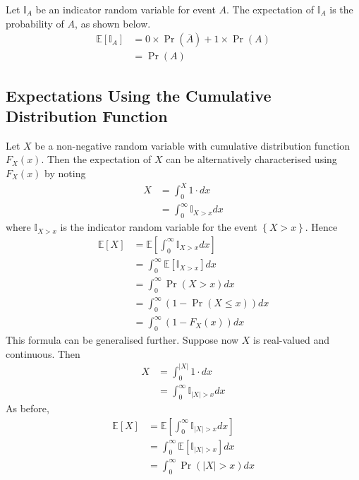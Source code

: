 \documentclass[11pt]{report} %
\begin{document}
Let $\mathbb{I}_{A}$ be an indicator random variable for event $A$. The expectation of $\mathbb{I}_{A}$ is the probability of $A$, as shown below.
\begin{align}
\mathbb{E}\left[\mathbb{I}_{A}\right] &= 0\times \operatorname{Pr}\left(\overline{A}\right) + 1\times \operatorname{Pr}\left(A\right) \\
&= \operatorname{Pr}\left(A\right)
\end{align}

\subsection{Expectations Using the Cumulative Distribution Function}

Let $X$ be a non-negative random variable with cumulative distribution function $F_{X}\left(x\right)$. Then the expectation of $X$ can be alternatively characterised using $F_{X}\left(x\right)$ by noting
\begin{align}
X &= \int_{0}^{X}1\cdot dx \\
&= \int_{0}^{\infty}\mathbb{I}_{X > x} dx
\end{align}
where $\mathbb{I}_{X > x}$ is the indicator random variable for the event $\left\{X > x\right\}$. Hence
\begin{align}
\mathbb{E}\left[X\right] &= \mathbb{E}\left[\int_{0}^{\infty}\mathbb{I}_{X > x} dx\right] \\
&= \int_{0}^{\infty}\mathbb{E}\left[\mathbb{I}_{X > x}\right] dx \\
&= \int_{0}^{\infty}\operatorname{Pr}\left(X > x\right) dx\\
&= \int_{0}^{\infty}\left(1 - \operatorname{Pr}\left(X \leq x\right)\right) dx \\
&= \int_{0}^{\infty}\left(1 - F_{X}\left(x\right)\right) dx
\end{align}
This formula can be generalised further. Suppose now $X$ is real-valued and continuous. Then
\begin{align}
X &= \int_{0}^{\left|X\right|}1\cdot dx \\
&= \int_{0}^{\infty}\mathbb{I}_{\left|X\right| > x} dx
\end{align}
As before,
\begin{align}
\mathbb{E}\left[X\right] &= \mathbb{E}\left[\int_{0}^{\infty}\mathbb{I}_{\left|X\right| > x} dx\right] \\
&= \int_{0}^{\infty}\mathbb{E}\left[\mathbb{I}_{\left|X\right| > x}\right] dx \\
&= \int_{0}^{\infty}\operatorname{Pr}\left(\left|X\right| > x\right) dx
\end{align}
\end{document}
